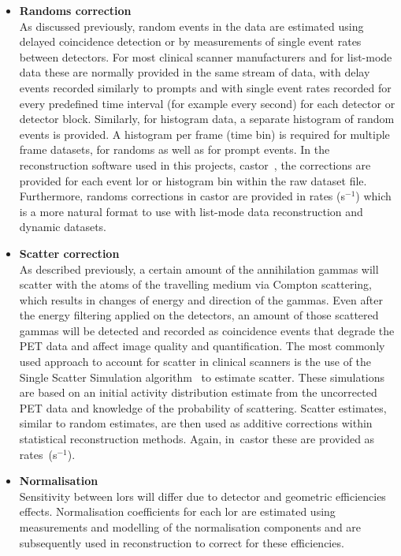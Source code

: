 \begin{itemize}
\item\textbf{Randoms correction}\\
As discussed previously, random events in the data are estimated using delayed coincidence detection or by measurements of single event rates between detectors. For most clinical scanner manufacturers and for list-mode data these are normally provided in the same stream of data, with delay events recorded similarly to prompts and with single event rates recorded for every predefined time interval (for example every second) for each detector or detector block. Similarly, for histogram data, a separate histogram of random events is provided. A histogram per frame (time bin) is required for multiple frame datasets, for randoms as well as for prompt events. 
In the reconstruction software used in this projects, \gls{castor}~\cite{Merlin2018}, the corrections are provided for each event \gls{lor} or histogram bin within the raw dataset file. Furthermore, randoms corrections in \gls{castor} are provided in rates (s$^{-1}$) which is a more natural format to use with list-mode data reconstruction and dynamic datasets.
\item\textbf{Scatter correction}\\
As described previously, a certain amount of the annihilation gammas will scatter with the atoms of the travelling medium via Compton scattering, which results in changes of energy and direction of the gammas. Even after the energy filtering applied on the detectors, an amount of those scattered gammas will be detected and recorded as coincidence events that degrade the PET data and affect image quality and quantification. The most commonly used approach to account for scatter in clinical scanners is the use of the Single Scatter Simulation algorithm~\cite{Watson1996} to estimate scatter. These simulations are based on an initial activity distribution estimate from the uncorrected PET data and knowledge of the probability of scattering. 
Scatter estimates, similar to random estimates, are then used as additive corrections within statistical reconstruction methods. Again, in~\gls{castor} these are provided as \mbox{rates (s$^{-1}$)}. 
\item\textbf{Normalisation}\\ 
Sensitivity between \glspl{lor} will differ due to detector and geometric efficiencies effects. Normalisation coefficients for each \gls{lor} are estimated using measurements and modelling of the normalisation components and are subsequently used in reconstruction to correct for these efficiencies.

\end{itemize}
